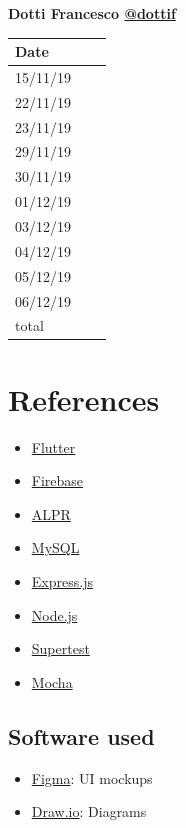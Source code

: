 \documentclass{article}
\begin{document}
	\begin{center}
		{\bf Dotti Francesco \href{https://github.com/dottif}{@dottif} }
		\vspace{2mm}

			\begin{tabular}{p{1.3cm}|p{1.8cm}|p{6.7cm}}
				\hline
				\bf Date & \bf \makebox[1.8cm][c]{Hours} & \bf \makebox[6.7cm][c]{Description} \\
				\hline
				15/11/19 & \makebox[1.8cm][c]{1} & \makebox[6.7cm][c]{Initial Structure}\\
				22/11/19 & \makebox[1.8cm][c]{1.5} & \makebox[6.7cm][c]{Introduction}\\
				23/11/19 & \makebox[1.8cm][c]{1.5} & \makebox[6.7cm][c]{Architectural design}\\
				29/11/19 & \makebox[1.8cm][c]{0.5} & \makebox[6.7cm][c]{Component view}\\
				30/11/19 & \makebox[1.8cm][c]{6.5}\makebox[6.7cm][c]{Component Deployment Runtime view}\\
				01/12/19 & \makebox[1.8cm][c]{8} & \makebox[6.7cm][c]{Architectural design}\\
				03/12/19 & \makebox[1.8cm][c]{0.5} & \makebox[6.7cm][c]{Architectural design}\\
				04/12/19 & \makebox[1.8cm][c]{2.5} & \makebox[6.7cm][c]{Architectural design}\\
				05/12/19 & \makebox[1.8cm][c]{4} & \makebox[6.7cm][c]{Req. traceability and Implementation}\\
				06/12/19 & \makebox[1.8cm][c]{3} & \makebox[6.7cm][c]{Implementation and Testing}\\
				\hline
				total    & \makebox[1.8cm][c]{30}
			\end{tabular}
	\end{center}
\section{References}
\begin{itemize}
	\item \href{https://flutter.dev/}{Flutter}
	\item \href{https://firebase.google.com/}{Firebase}
	\item \href{https://www.openalpr.com/}{ALPR}
	\item \href{https://www.mysql.com/}{MySQL}
	\item \href{https://expressjs.com/}{Express.js}
	\item \href{https://nodejs.org/en/}{Node.js}
	\item \href{https://www.npmjs.com/package/supertest}{Supertest}
	\item \href{https://mochajs.org/}{Mocha}
\end{itemize}
\subsection{Software used}
\begin{itemize}
	\item \href{https://www.figma.com/}{Figma}: UI mockups
	\item \href{https://www.draw.io/}{Draw.io}: Diagrams
\end{itemize} 
\end{document}
